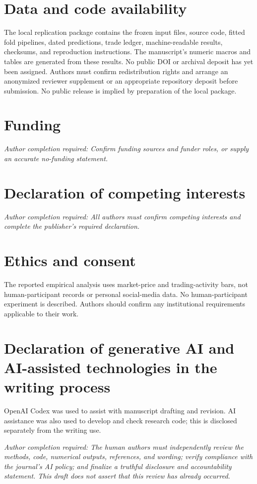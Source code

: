 \documentclass[preprint,12pt,authoryear]{elsarticle}
\newcommand{\draftnote}[1]{\par\noindent\textit{Author completion required: #1}\par}
\begin{document}
\section*{Data and code availability}
The local replication package contains the frozen input files, source code, fitted fold pipelines, dated predictions, trade ledger, machine-readable results, checksums, and reproduction instructions. The manuscript's numeric macros and tables are generated from these results. No public DOI or archival deposit has yet been assigned. Authors must confirm redistribution rights and arrange an anonymized reviewer supplement or an appropriate repository deposit before submission. No public release is implied by preparation of the local package.

\section*{Funding}
\draftnote{Confirm funding sources and funder roles, or supply an accurate no-funding statement.}
\section*{Declaration of competing interests}
\draftnote{All authors must confirm competing interests and complete the publisher's required declaration.}
\section*{Ethics and consent}
The reported empirical analysis uses market-price and trading-activity bars, not human-participant records or personal social-media data. No human-participant experiment is described. Authors should confirm any institutional requirements applicable to their work.
\section*{Declaration of generative AI and AI-assisted technologies in the writing process}
OpenAI Codex was used to assist with manuscript drafting and revision. AI assistance was also used to develop and check research code; this is disclosed separately from the writing use. \draftnote{The human authors must independently review the methods, code, numerical outputs, references, and wording; verify compliance with the journal's AI policy; and finalize a truthful disclosure and accountability statement. This draft does not assert that this review has already occurred.}
\end{document}
